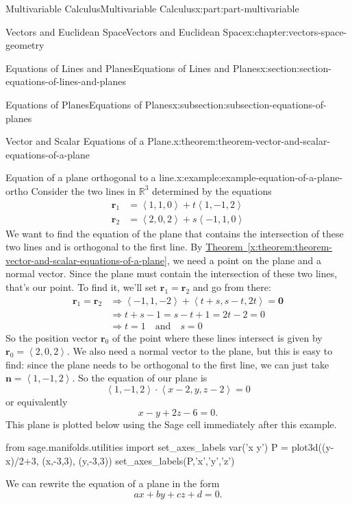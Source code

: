 \documentclass[twoside,10pt,]{book}
\newcommand{\xreffont}{\relax}
\numberwithin{equation}{part}
\newcommand{\RR}{\mathbb{R}}
\newcommand{\dotprod}[1]{\left\langle #1 \right\rangle}
\begin{document}
\begin{partptx}{Multivariable Calculus}{}{Multivariable Calculus}{}{}{x:part:part-multivariable}
\begin{chapterptx}{Vectors and Euclidean Space}{}{Vectors and Euclidean Space}{}{}{x:chapter:vectors-space-geometry}
\begin{sectionptx}{Equations of Lines and Planes}{}{Equations of Lines and Planes}{}{}{x:section:section-equations-of-lines-and-planes}
\begin{subsectionptx}{Equations of Planes}{}{Equations of Planes}{}{}{x:subsection:subsection-equations-of-planes}
\begin{theorem}{Vector and Scalar Equations of a Plane.}{}{x:theorem:theorem-vector-and-scalar-equations-of-a-plane}
\end{theorem}
\begin{example}{Equation of a plane orthogonal to a line.}{x:example:example-equation-of-a-plane-ortho}%
Consider the two lines in \(\RR^{3}\) determined by the equations%
%
\begin{align*}
\mathbf{r}_{1} & = \dotprod{1,1,0} + t\dotprod{1,-1,2} \\
\mathbf{r}_{2} & = \dotprod{2,0,2} + s\dotprod{-1,1,0} 
\end{align*}
We want to find the equation of the plane that contains the intersection of these two lines and is orthogonal to the first line. By \hyperref[x:theorem:theorem-vector-and-scalar-equations-of-a-plane]{Theorem~{\xreffont\ref{x:theorem:theorem-vector-and-scalar-equations-of-a-plane}}}, we need a point on the plane and a normal vector. Since the plane must contain the intersection of these two lines, that's our point. To find it, we'll set \(\mathbf{r}_{1} = \mathbf{r}_{2}\) and go from there:%
%
\begin{align*}
\mathbf{r}_{1}=\mathbf{r}_{2} & \Rightarrow \dotprod{-1,1,-2} + \dotprod{t+s,s-t,2t} = \mathbf{0} \\
& \Rightarrow t+s-1 = s-t+1 = 2t-2 = 0 \\
& \Rightarrow t = 1\quad\text{and}\quad s=0 
\end{align*}
So the position vector \(\mathbf{r}_{0}\) of the point where these lines intersect is given by \(\mathbf{r}_{0} = \dotprod{2,0,2}\). We also need a normal vector to the plane, but this is easy to find: since the plane needs to be orthogonal to the first line, we can just take \(\mathbf{n} = \dotprod{1,-1,2}\). So the equation of our plane is%
%
\begin{equation*}
\dotprod{1,-1,2}\cdot\dotprod{x-2,y,z-2} = 0
\end{equation*}
or equivalently%
%
\begin{equation*}
x-y+2z -6 = 0.
\end{equation*}
This plane is plotted below using the Sage cell immediately after this example.%
\end{example}
\begin{sageinput}
from sage.manifolds.utilities import set_axes_labels
var('x y')
P = plot3d((y-x)/2+3, (x,-3,3), (y,-3,3))
set_axes_labels(P,'x','y','z')
\end{sageinput}
We can rewrite the equation of a plane in the form%
%
\begin{equation*}
ax+by+cz+d = 0.
\end{equation*}

\end{subsectionptx}
\end{sectionptx}
\end{chapterptx}
\end{partptx}
\end{document}

